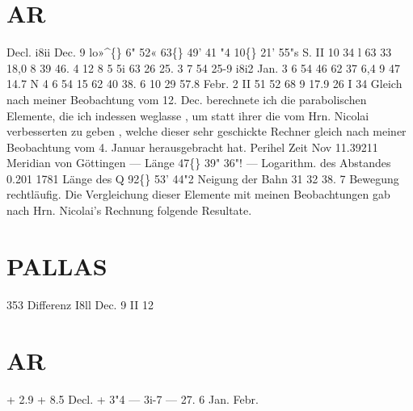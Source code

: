 \documentclass[12pt,a4paper]{article}
\newcommand{\degree}{\textdegree}
\begin{document}
\section*{AR}
Decl. 
i8ii  Dec.  9 
lo»\textasciicircum\{\}  6"  52« 
63\degree\{\}  49'  41 "4 
10\degree\{\}  21'  55"s  S. 
II 
10  34   l 
63  33  18,0 
8  39  46. 4 
12 
8   5  5i 
63  26  25. 3 
7  54  25-9 
i8i2  Jan.  3 
6  54  46 
62  37   6,4 
9  47  14.7  N 
4 
6  54  15 
62  40  38.  6 
10  29  57.8 
Febr.  2 
II  51  52 
68   9  17.9 
26   I  34 
Gleich  nach  meiner  Beobachtung  vom  12.  Dec.  berechnete  ich  die  parabolischen  Elemente,  die 
ich  indessen  weglasse ,  um  statt  ihrer  die  vom  Hrn.  Nicolai  verbesserten  zu  geben ,  welche  dieser  sehr 
geschickte  Rechner  gleich  nach  meiner  Beobachtung  vom  4.  Januar  herausgebracht  hat. 
Perihel  Zeit  Nov  11.39211  Meridian  von  Göttingen 
---  Länge       
  47\degree\{\}  39"  36"! 
---  Logarithm.  des  Abstandes    0.201 1781 
Länge  des   Q    92\degree\{\}  53'  44"2 
Neigung  der  Bahn    31    32    38. 7 
Bewegung  rechtläufig. 
Die  Vergleichung  dieser  Elemente  mit  meinen  Beobachtungen  gab  nach  Hrn.  Nicolai's  Rechnung 
folgende  Resultate. 


\newpage

\section*{PALLAS}
353 
Differenz 
I8ll 
Dec.    9 
II 
12 

\section*{AR}
+  2.9 
+  8.5 
Decl. 
+    3"4 
---  3i-7 
---  27.  6 
Jan. 
Febr. 
\end{document}
